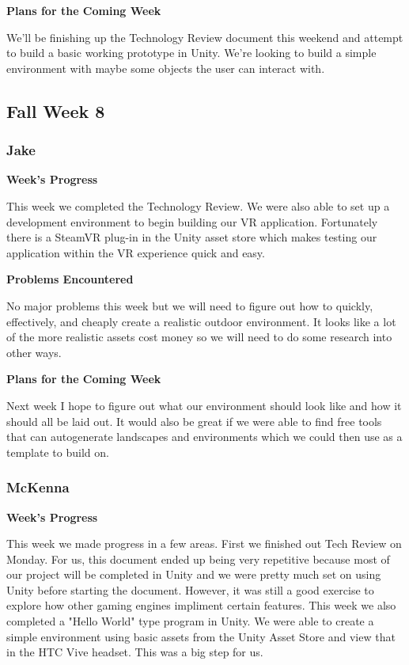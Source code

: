 \documentclass[10pt,journal,compsoc,onecolumn, draftclsnofoot]{IEEEtran}
\begin{document}
\noindent \textbf{Plans for the Coming Week}

We'll be finishing up the Technology Review document this weekend and attempt to build a basic working prototype in Unity. We're looking to build a simple environment with maybe some objects the user can interact with.

\subsection{Fall Week 8}
\subsubsection{Jake}
\noindent \textbf{Week's Progress}

This week we completed the Technology Review. We were also able to set up a development environment to begin building our VR application. Fortunately there is a SteamVR plug-in in the Unity asset store which makes testing our application within the VR experience quick and easy.

\noindent \textbf{Problems Encountered}

No major problems this week but we will need to figure out how to quickly, effectively, and cheaply create a realistic outdoor environment. It looks like a lot of the more realistic assets cost money so we will need to do some research into other ways.

\noindent \textbf{Plans for the Coming Week}

Next week I hope to figure out what our environment should look like and how it should all be laid out. It would also be great if we were able to find free tools that can autogenerate landscapes and environments which we could then use as a template to build on.

\subsubsection{McKenna}
\noindent \textbf{Week's Progress}

This week we made progress in a few areas. First we finished out Tech Review on Monday. For us, this document ended up being very repetitive because most of our project will be completed in Unity and we were pretty much set on using Unity before starting the document. However, it was still a good exercise to explore how other gaming engines impliment certain features. This week we also completed a "Hello World" type program in Unity. We were able to create a simple environment using basic assets from the Unity Asset Store and view that in the HTC Vive headset. This was a big step for us.
\end{document}
